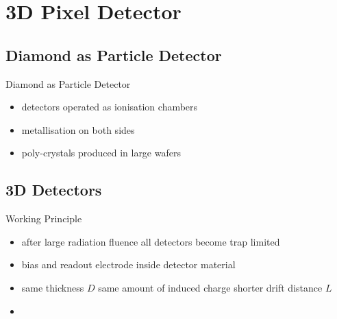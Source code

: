 \section{3D Pixel Detector}
\subsection{Diamond as Particle Detector}
\begin{frame}{Diamond as Particle Detector}

	
	\begin{itemize}\itemfill
		\item detectors operated as ionisation chambers 
		\item metallisation on both sides
		\item poly-crystals produced in large wafers
	\end{itemize}

\end{frame}

\subsection{3D Detectors}
\begin{frame}{Working Principle}

	
	\begin{itemize}\itemfill
		\item after large radiation fluence all detectors become trap limited
		\item bias and readout electrode inside detector material
		\item same thickness $D$ \ra same amount of induced charge \ra shorter drift distance $L$
		\item {}
	\end{itemize}

\end{frame}

